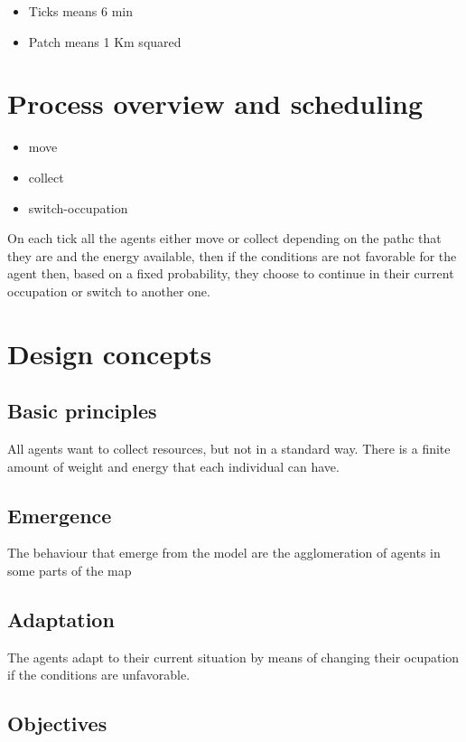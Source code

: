 \documentclass{wscpaperproc}
\theoremstyle{wsc}
\begin{document}
\begin{itemize}
    \item Ticks means 6 min
    \item Patch means 1 Km squared
\end{itemize}

\section{Process overview and scheduling}

\begin{itemize}
    \item move
    \item collect
    \item switch-occupation
\end{itemize}

On each tick all the agents either move or collect depending on the pathc that
they are and the energy available, then if the conditions are not favorable for
the agent then, based on a fixed probability, they choose to continue in their
current occupation or switch to another one.

\section{Design concepts}

\subsection{Basic principles}

All agents want to collect resources, but not in a standard way. There is a
finite amount of weight and energy that each individual can have.

\subsection{Emergence}

The behaviour that emerge from the model are the agglomeration of agents in
some parts of the map

\subsection{Adaptation}

The agents adapt to their current situation by means of changing their
ocupation if the conditions are unfavorable.

\subsection{Objectives}
\end{document}
